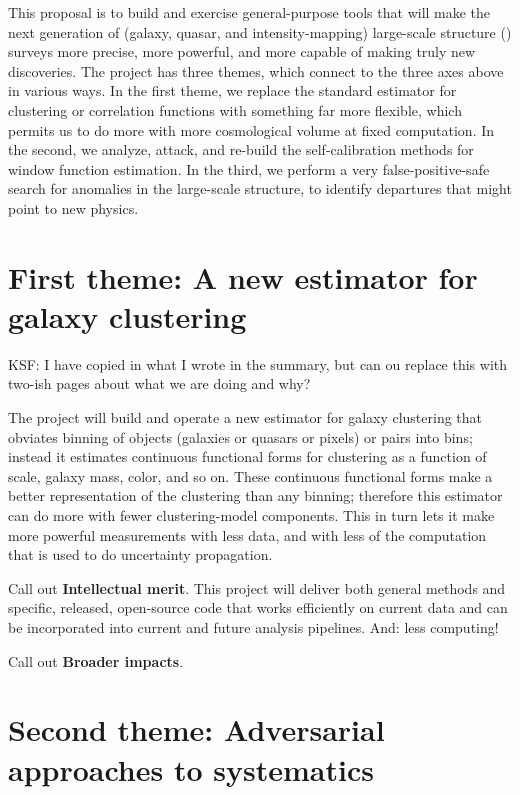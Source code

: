 \documentclass[12pt, fullpage, letterpaper]{article}
\begin{document}
This proposal is to build and exercise general-purpose tools that will
make the next generation of (galaxy, quasar, and intensity-mapping)
large-scale structure (\LSS) surveys more precise, more powerful, and
more capable of making truly new discoveries.
The project has three themes, which connect to the three axes above in
various ways.
In the first theme, we replace the standard estimator for clustering or
correlation functions with something far more flexible, which permits us
to do more with more cosmological volume at fixed computation.
In the second, we analyze, attack, and re-build the self-calibration 
methods for window function estimation.
In the third, we perform a very false-positive-safe search for anomalies
in the large-scale structure, to identify departures that might point to
new physics.

\section{First theme: A new estimator for galaxy clustering}

KSF: I have copied in what I wrote in the summary, but can ou replace
this with two-ish pages about what we are doing and why?

The project will build and operate a new estimator for
galaxy clustering that obviates binning of objects (galaxies or
quasars or pixels) or pairs into bins; instead it estimates continuous
functional forms for clustering as a function of scale, galaxy mass,
color, and so on.
These continuous functional forms make a better representation of the
clustering than any binning; therefore this estimator can do more with
fewer clustering-model components.
This in turn lets it make more powerful measurements with less data,
and with less of the computation that is used to do uncertainty
propagation.

Call out \textbf{Intellectual merit}.
This project will deliver both general methods and specific, released,
open-source code that works efficiently on current data and can be
incorporated into current and future analysis pipelines. And: less computing!

Call out \textbf{Broader impacts}.

\section{Second theme: Adversarial approaches to systematics}
\end{document}
